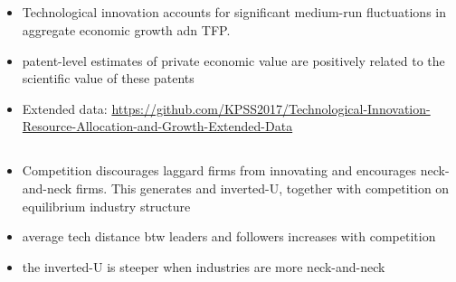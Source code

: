 \documentclass[10pt]{article} %
\begin{document}
    \subsection{\cite{BaiJinLu2023}}

    \subsection{\cite{AdaoBerajaPandalaiNayar2020}}

    \subsection{\cite{LiuMa2023}}

    \subsection{\cite{KoganPapanikolaouSeruStoffman2017}}
    \begin{itemize}
        \item Technological innovation accounts for significant medium-run fluctuations in aggregate economic growth adn TFP.
        \item patent-level estimates of private economic value are positively related to the scientific value of these patents
        \item Extended data: \url{https://github.com/KPSS2017/Technological-Innovation-Resource-Allocation-and-Growth-Extended-Data}
    \end{itemize}

    \subsection{\cite{AghionBloomBlundellGriffithHowitt2005}}
    \begin{itemize}
        \item Competition discourages laggard firms from innovating and encourages neck-and-neck firms. This generates and inverted-U, together with competition on equilibrium industry structure
        \item average tech distance  btw leaders and followers increases with competition
        \item the inverted-U is steeper when industries are more neck-and-neck
    \end{itemize}
\end{document}

